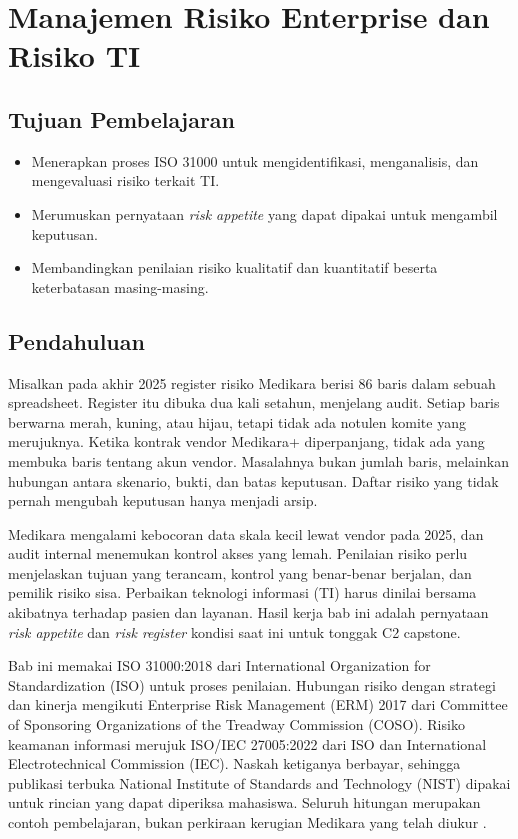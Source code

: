 \chapter{Manajemen Risiko Enterprise dan Risiko TI}

\section*{Tujuan Pembelajaran}
\begin{itemize}
  \item Menerapkan proses ISO 31000 untuk mengidentifikasi, menganalisis, dan mengevaluasi risiko
  terkait TI.
  \item Merumuskan pernyataan \textit{risk appetite} yang dapat dipakai untuk mengambil keputusan.
  \item Membandingkan penilaian risiko kualitatif dan kuantitatif beserta keterbatasan
  masing-masing.
\end{itemize}

\section{Pendahuluan}

Misalkan pada akhir 2025 register risiko Medikara berisi 86 baris dalam sebuah spreadsheet.
Register itu dibuka dua kali setahun, menjelang audit. Setiap baris berwarna merah, kuning, atau
hijau, tetapi tidak ada notulen komite yang merujuknya. Ketika kontrak vendor Medikara+ diperpanjang,
tidak ada yang membuka baris tentang akun vendor. Masalahnya bukan jumlah baris, melainkan hubungan
antara skenario, bukti, dan batas keputusan. Daftar risiko yang tidak pernah mengubah keputusan
hanya menjadi arsip.

Medikara mengalami kebocoran data skala kecil lewat vendor pada 2025, dan audit internal menemukan
kontrol akses yang lemah. Penilaian risiko perlu menjelaskan tujuan yang terancam, kontrol yang
benar-benar berjalan, dan pemilik risiko sisa. Perbaikan teknologi informasi (TI) harus dinilai
bersama akibatnya terhadap pasien dan layanan. Hasil kerja bab ini adalah pernyataan \textit{risk
appetite} dan \textit{risk register} kondisi saat ini untuk tonggak C2 capstone.

Bab ini memakai ISO 31000:2018 dari International Organization for Standardization (ISO) untuk
proses penilaian. Hubungan risiko dengan strategi dan kinerja mengikuti Enterprise Risk Management
(ERM) 2017 dari Committee of Sponsoring Organizations of the Treadway Commission (COSO). Risiko
keamanan informasi merujuk ISO/IEC 27005:2022 dari ISO dan International Electrotechnical Commission
(IEC). Naskah ketiganya berbayar, sehingga publikasi terbuka National Institute of Standards and
Technology (NIST) dipakai untuk rincian yang dapat diperiksa mahasiswa. Seluruh hitungan merupakan
contoh pembelajaran, bukan perkiraan kerugian Medikara yang telah diukur
\cite{iso31000-2018,cosoerm2017,iso27005-2022,c05-nist-ir8286r1}.

